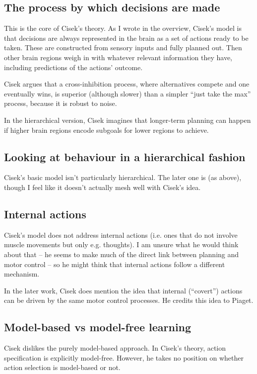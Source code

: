 \documentclass[10pt,a4paper]{article}
\newcommand{\nquote}[1]{``{#1}''}
\begin{document}
\subsection{The process by which decisions are made}
This is the core of Cisek's theory. As I wrote in the overview, Cisek's model is that decisions are always represented in the brain as a set of actions ready to be taken. These are constructed from sensory inputs and fully planned out. Then other brain regions weigh in with whatever relevant information they have, including predictions of the actions' outcome.

Cisek argues that a cross-inhibition process, where alternatives compete and one eventually wins, is superior (although slower) than a simpler \nquote{just take the max} process, because it is robust to noise.

In the hierarchical version, Cisek imagines that longer-term planning can happen if higher brain regions encode subgoals for lower regions to achieve.

\subsection{Looking at behaviour in a hierarchical fashion}
Cisek's basic model isn't particularly hierarchical. The later one is (as above), though I feel like it doesn't actually mesh well with Cisek's idea.

\subsection{Internal actions}
Cisek's model does not address internal actions (i.e. ones that do not involve muscle movements but only e.g. thoughts). I am unsure what he would think about that -- he seems to make much of the direct link between planning and motor control -- so he might think that internal actions follow a different mechanism.

In the later work, Cisek does mention the idea that internal (\nquote{covert}) actions can be driven by the same motor control processes. He credits this idea to Piaget.

\subsection{Model-based vs model-free learning}
Cisek dislikes the purely model-based approach. In Cisek's theory, action specification is explicitly model-free. However, he takes no position on whether action selection is model-based or not.
\end{document}
